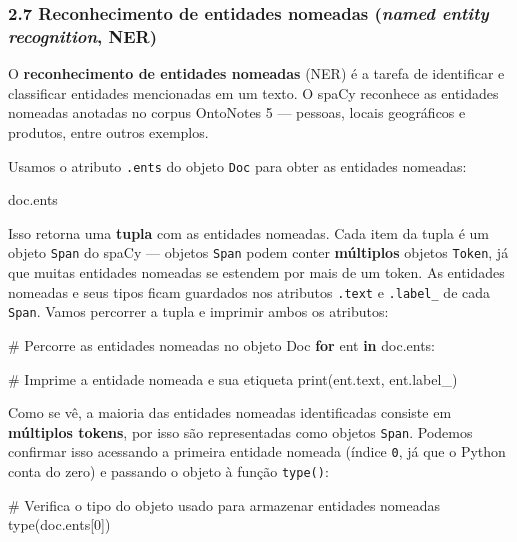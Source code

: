 \documentclass[
  brazilian,
  11pt,
]{article}
\newenvironment{Shaded}{\begin{snugshade}}{\end{snugshade}}
\newcommand{\BuiltInTok}[1]{\textcolor[rgb]{0.50,0.55,0.55}{#1}}
\newcommand{\CommentTok}[1]{\textcolor[rgb]{0.48,0.49,0.49}{#1}}
\newcommand{\ControlFlowTok}[1]{\textcolor[rgb]{0.99,0.74,0.29}{\textbf{#1}}}
\newcommand{\DecValTok}[1]{\textcolor[rgb]{0.96,0.45,0.00}{#1}}
\newcommand{\KeywordTok}[1]{\textcolor[rgb]{0.81,0.81,0.76}{\textbf{#1}}}
\newcommand{\NormalTok}[1]{\textcolor[rgb]{0.81,0.81,0.76}{#1}}
\let\oldtexttt\texttt
\renewcommand{\texttt}[1]{{\color{inlink}\oldtexttt{#1}}}
\begin{document}
\subsubsection{\texorpdfstring{2.7 Reconhecimento de entidades nomeadas
(\emph{named entity recognition},
NER)}{2.7 Reconhecimento de entidades nomeadas (named entity recognition, NER)}}\label{reconhecimento-de-entidades-nomeadas-named-entity-recognition-ner}

O \textbf{reconhecimento de entidades nomeadas} (NER) é a tarefa de
identificar e classificar entidades mencionadas em um texto. O spaCy
reconhece as entidades nomeadas anotadas no corpus OntoNotes 5 ---
pessoas, locais geográficos e produtos, entre outros exemplos.

Usamos o atributo \texttt{.ents} do objeto \texttt{Doc} para obter as
entidades nomeadas:

\begin{Shaded}
\begin{Highlighting}[]
\NormalTok{doc.ents}
\end{Highlighting}
\end{Shaded}

Isso retorna uma \textbf{tupla} com as entidades nomeadas. Cada item da
tupla é um objeto \texttt{Span} do spaCy --- objetos \texttt{Span} podem
conter \textbf{múltiplos} objetos \texttt{Token}, já que muitas
entidades nomeadas se estendem por mais de um token. As entidades
nomeadas e seus tipos ficam guardados nos atributos \texttt{.text} e
\texttt{.label\_} de cada \texttt{Span}. Vamos percorrer a tupla e
imprimir ambos os atributos:

\begin{Shaded}
\begin{Highlighting}[]
\CommentTok{\# Percorre as entidades nomeadas no objeto Doc}
\ControlFlowTok{for}\NormalTok{ ent }\KeywordTok{in}\NormalTok{ doc.ents:}

    \CommentTok{\# Imprime a entidade nomeada e sua etiqueta}
    \BuiltInTok{print}\NormalTok{(ent.text, ent.label\_)}
\end{Highlighting}
\end{Shaded}

Como se vê, a maioria das entidades nomeadas identificadas consiste em
\textbf{múltiplos tokens}, por isso são representadas como objetos
\texttt{Span}. Podemos confirmar isso acessando a primeira entidade
nomeada (índice \texttt{0}, já que o Python conta do zero) e passando o
objeto à função \texttt{type()}:

\begin{Shaded}
\begin{Highlighting}[]
\CommentTok{\# Verifica o tipo do objeto usado para armazenar entidades nomeadas}
\BuiltInTok{type}\NormalTok{(doc.ents[}\DecValTok{0}\NormalTok{])}
\end{Highlighting}
\end{Shaded}
\end{document}
